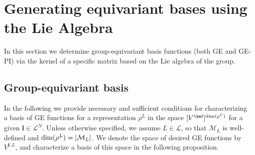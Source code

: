 \documentclass{article}
\newcommand{\rep}[2]{\rho^{#1}_{#2}}
\newcommand{\card}[1]{|{#1}|}
\numberwithin{equation}{section}
\def\bl{{\bm l}}
\def\calM{\mathcal{M}}
\def\calL{\mathcal{L}}
\def\Nat{{N}}
\def\dim{{{\rm dim}}}
\begin{document}
\section{Generating equivariant bases using the Lie Algebra}
\label{sec:equivariant_lie_algebra}

In this section we determine group-equivariant basis functions (both GE and GE-PI)
via the kernel of a specific matrix 
based on the Lie algebra of the group.

\subsection{Group-equivariant basis}

In the following we provide necessary and sufficient conditions for characterizing a basis of GE functions for a representation $\rep{L}{}$ in the space $[V^\bl]^{\dim(\rep{L}{})}$ for a given $\bl\in\calL^\Nat$.
Unless otherwise specified, we assume $L\in\calL$, so that $\calM_L$ is well-defined and $\dim(\rep{L}{})=\card{\calM_L}$. We denote the space of desired GE functions by $V^{\bl,L}$, and characterize a basis of this space in the following proposition.
\end{document}
